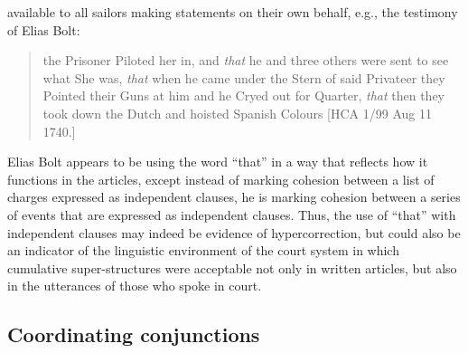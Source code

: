 available to all sailors making statements on their own behalf, e.g., the testimony of Elias Bolt:

\begin{quotation}
the Prisoner Piloted her in, and \textit{that} he and three others were sent to see what She was, \textit{that} when he came under the Stern of said Privateer they Pointed their Guns at him and he Cryed out for Quarter, \textit{that} then they took down the Dutch and hoisted Spanish Colours [HCA 1/99  Aug 11 1740.]
\end{quotation}

Elias Bolt appears to be using the word “that” in a way that reflects how it functions in the articles, except instead of marking cohesion between a list of charges expressed as independent clauses, he is marking cohesion between a series of events that are expressed as independent clauses. Thus, the use of “that” with independent clauses may indeed be evidence of hypercorrection, but could also be an indicator of the linguistic environment of the court system in which cumulative super-structures were acceptable not only in written articles, but also in the utterances of those who spoke in court. 

\subsection{{Coordinating conjunctions} }%

